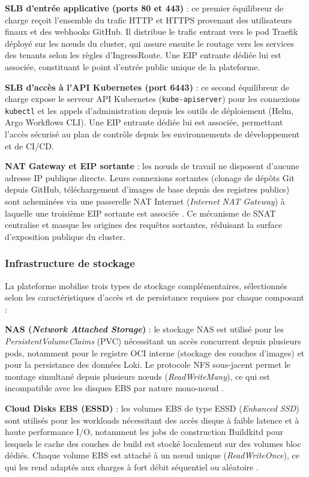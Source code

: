 \textbf{SLB d'entrée applicative (ports 80 et 443)} : ce premier équilibreur de charge reçoit l'ensemble du trafic HTTP et HTTPS provenant des utilisateurs finaux et des webhooks GitHub. Il distribue le trafic entrant vers le pod Traefik déployé sur les nœuds du cluster, qui assure ensuite le routage vers les services des tenants selon les règles d'IngressRoute. Une EIP entrante dédiée lui est associée, constituant le point d'entrée public unique de la plateforme.

\textbf{SLB d'accès à l'API Kubernetes (port 6443)} : ce second équilibreur de charge expose le serveur API Kubernetes (\texttt{kube-apiserver}) pour les connexions \texttt{kubectl} et les appels d'administration depuis les outils de déploiement (Helm, Argo Workflows CLI). Une EIP entrante dédiée lui est associée, permettant l'accès sécurisé au plan de contrôle depuis les environnements de développement et de CI/CD.

\textbf{NAT Gateway et EIP sortante} : les nœuds de travail ne disposent d'aucune adresse IP publique directe. Leurs connexions sortantes (clonage de dépôts Git depuis GitHub, téléchargement d'images de base depuis des registres publics) sont acheminées via une passerelle NAT Internet (\textit{Internet NAT Gateway}) à laquelle une troisième EIP sortante est associée \cite{alibaba-vpc}. Ce mécanisme de SNAT centralise et masque les origines des requêtes sortantes, réduisant la surface d'exposition publique du cluster.

\subsubsection*{Infrastructure de stockage}

La plateforme mobilise trois types de stockage complémentaires, sélectionnés selon les caractéristiques d'accès et de persistance requises par chaque composant \cite{alibaba-csi} :

\textbf{NAS (\textit{Network Attached Storage})} : le stockage NAS est utilisé pour les \textit{PersistentVolumeClaims} (PVC) nécessitant un accès concurrent depuis plusieurs pods, notamment pour le registre OCI interne (stockage des couches d'images) et pour la persistance des données Loki. Le protocole NFS sous-jacent permet le montage simultané depuis plusieurs nœuds (\textit{ReadWriteMany}), ce qui est incompatible avec les disques EBS par nature mono-nœud \cite{alibaba-nas}.

\textbf{Cloud Disks EBS (ESSD)} : les volumes EBS de type ESSD (\textit{Enhanced SSD}) sont utilisés pour les workloads nécessitant des accès disque à faible latence et à haute performance I/O, notamment les jobs de construction Buildkitd pour lesquels le cache des couches de build est stocké localement sur des volumes bloc dédiés. Chaque volume EBS est attaché à un nœud unique (\textit{ReadWriteOnce}), ce qui les rend adaptés aux charges à fort débit séquentiel ou aléatoire \cite{alibaba-csi}.


